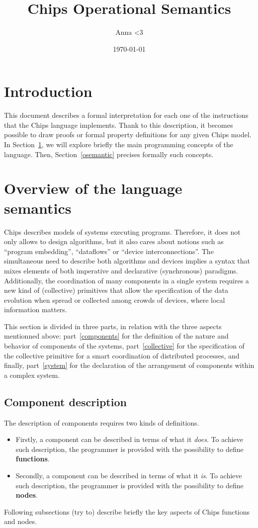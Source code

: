 \documentclass{article}
\title{Chips Operational Semantics}
\author{Anna <3}
\date{\today}
\begin{document}
\maketitle

\section*{Introduction}
This document describes a formal interpretation for each one of the instructions that the Chips language implements. Thank to this description, it becomes possible to draw proofs or formal property definitions for any given Chips model.
In Section~\ref{overview}, we will explore briefly the main programming concepts of the language. Then, Section~\ref{osemantic} precises formally such concepts.

\section{Overview of the language semantics}\label{overview}
Chips describes models of systems executing programs. Therefore, it does not only allows to design algorithms, but it also cares about notions such as ``program embedding'', ``dataflows'' or ``device interconnections''. The simultaneous need to describe both algorithms and devices implies a syntax that mixes elements of both imperative and declarative (synchronous) paradigms. Additionally, the coordination of many components in a single system requires a new kind of (collective) primitives that allow the specification of the data evolution when spread or collected among crowds of devices, where local information matters.


This section is divided in three parts, in relation with the three aspects mentionned above: part~\ref{components} for the definition of the nature and behavior of components of the systems, part~\ref{collective} for the specification of the collective primitive for a smart coordination of distributed processes, and finally, part~\ref{system} for the declaration of the arrangement of components within a complex system.

\subsection{Component description}
The description of components requires two kinds of definitions.
\begin{itemize}
    \item Firstly, a component can be described in terms of what it \emph{does}. To achieve such description, the programmer is provided with the possibility to define \textbf{functions}.
    \item Secondly, a component can be described in terms of what it \emph{is}. To achieve such description, the programmer is provided with the possibility to define \textbf{nodes}.
\end{itemize}
Following subsections (try to) describe briefly the key aspects of Chips functions and nodes.
\end{document}
